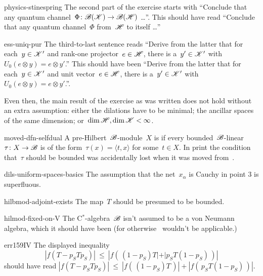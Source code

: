 \begin{erratum}{physics-stinespring}%
The second part of the exercise starts with
    ``Conclude that any quantum channel~$\Phi\colon \mathscr{B}(\mathscr{K}) \to \mathscr{B}(\mathscr{H})$ \ldots''.
This should have read
    ``Conclude that any quantum channel~$\Phi$ from~$\mathscr{H}$ to itself \ldots''
\end{erratum}
\begin{erratum}{ess-uniq-pur}%
The third-to-last sentence reads
``Derive from the latter
that for each~$y \in \mathscr{K}'$ and rank-one projector~$e \in \mathscr{H}$,
there is a~$y' \in \mathscr{K}'$
with~$U_0 (e \otimes y) = e \otimes y'$.''
This should have been
``Derive from the latter
that for each~$y \in \mathscr{K}'$ and unit vector~$e \in \mathscr{H}$,
there is a~$y' \in \mathscr{K}'$
with~$U_0 (e \otimes y) = e \otimes y'$.''.

Even then, the main result of the exercise as was written does not hold without
        an extra assumption: either the dilations have to be minimal;
the ancillar spaces of the same dimension;
or~$\dim \mathscr{H}, \dim \mathscr{K} < \infty$.
\end{erratum}
\begin{erratum}{moved-dfn-selfdual}%
    A pre-Hilbert~$\mathscr{B}$-module~$X$ is 
    if every bounded~$\mathscr{B}$-linear~$\tau \colon X \to \mathscr{B}$
    is of the form~$\tau(x) = \langle t, x\rangle$ for some~$t \in X$.
In print the condition that~$\tau$ should be bounded
        was accidentally lost when it was moved from~.
\end{erratum}
\begin{erratum}{dils-uniform-spaces-basics}%
The assumption  that the net~$x_\alpha$ is Cauchy in point 3
    is superfluous.
\end{erratum}
\begin{erratum}{hilbmod-adjoint-exists}%
The map~$T$ should be presumed to be bounded.
\end{erratum}
\begin{erratum}{hilmod-fixed-on-V}%
The C$^*$-algebra~$\mathscr{B}$ isn't assumed to be a von Neumann algebra,
    which it should have been (for otherwise~ wouldn't
    be applicable.)
\end{erratum}
\begin{erratum}{err159IV}%
The displayed
    inequality
\begin{equation*}
    |f(T - p_S T p_S)| \ \leq \  |f(\, (1-p_S) T | +| p_S T (1-p_S) \,)|
\end{equation*}
    should have read
    $|f(T - p_S T p_S)| \ \leq \  |f(\, (1-p_S) T \,) | +| f(\, p_S T (1-p_S) \,)|$.
\end{erratum}
